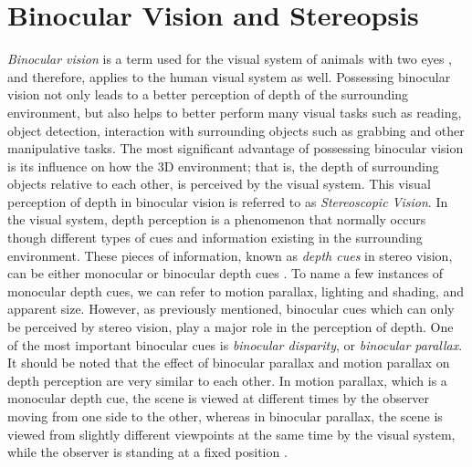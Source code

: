 \chapter{Binocular Vision and Stereopsis}
\label{chap:BinocularVision}

\textit{Binocular vision} is a term used for the visual system of animals with two eyes \cite{how95}, and therefore, applies to the human visual system as well. 
Possessing binocular vision not only leads to a better perception of depth
of the surrounding environment, but also helps to better perform many visual tasks such as reading, object detection, interaction with surrounding objects such as grabbing and other manipulative 
tasks. The most significant advantage of possessing binocular vision is its influence on how the 3D environment; that is, the 
depth of surrounding objects relative to each other, 
is perceived by the visual system. This visual perception of depth in binocular vision is referred to as {\it Stereoscopic Vision}.
In the visual system, depth perception is a phenomenon that normally occurs though different types of cues and information existing in the surrounding environment. 
These pieces of information, known as {\it depth cues} in stereo vision, can be either monocular or binocular depth cues \cite{how95}.
To name a few instances of monocular depth cues, we can refer to motion parallax, lighting and shading, and apparent size. 
However, as previously mentioned, binocular cues which can only be perceived
by stereo vision, play a major role in the perception of depth. One of the most important binocular cues is {\it binocular disparity}, or {\it binocular parallax}. 
It should be noted that the effect of binocular parallax and motion parallax on depth perception are very similar to each other. 
In motion parallax, which is a monocular depth cue, the scene is viewed at different times by the observer moving from one side to the other, 
whereas in binocular parallax, the scene is viewed from slightly different viewpoints at
the same time by the visual system, while the observer is standing at a fixed position \cite{how95}.

